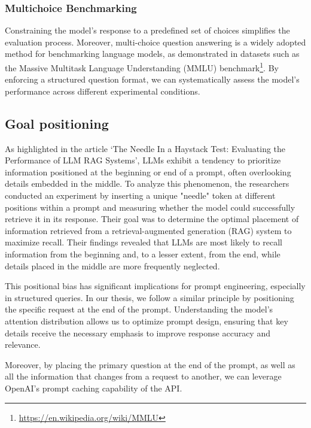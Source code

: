 \subsubsection{Multichoice Benchmarking}

Constraining the model's response to a predefined set of choices simplifies the evaluation
process. Moreover, multi-choice question answering is a widely adopted method for
benchmarking language models, as demonstrated in datasets such as the Massive
Multitask Language Understanding (MMLU) benchmark\footnote{\url{https://en.wikipedia.org/wiki/MMLU}}.
By enforcing a structured question format, we can systematically assess the model's
performance across different experimental conditions.

\subsection{Goal positioning}
\label{sub:goal_positioning}

As highlighted in the article `The Needle In a Haystack Test: Evaluating the
Performance of LLM RAG Systems'\cite{needleRAG}, LLMs exhibit a tendency to prioritize
information positioned at the beginning or end of a prompt, often overlooking
details embedded in the middle. To analyze this phenomenon, the researchers
conducted an experiment by inserting a unique "needle" token at different
positions within a prompt and measuring whether the model could successfully
retrieve it in its response. Their goal was to determine the optimal placement of
information retrieved from a retrieval-augmented generation (RAG) system to maximize
recall. Their findings revealed that LLMs are most likely to recall information
from the beginning and, to a lesser extent, from the end, while details placed in
the middle are more frequently neglected.

This positional bias has significant implications for prompt engineering,
especially in structured queries. In our thesis, we follow a similar principle
by positioning the specific request at the end of the prompt. Understanding the model's
attention distribution allows us to optimize prompt design, ensuring that key
details receive the necessary emphasis to improve response accuracy and
relevance.

Moreover, by placing the primary question at the end of the prompt, as well as
all the information that changes from a request to another, we can leverage OpenAI's
prompt caching capability of the API.

